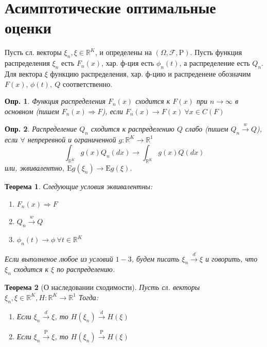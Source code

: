 \documentclass[12pt]{article}
\newtheorem{definition}{Опр.}
\theoremstyle{basic_theorem}
\newtheorem{theorem}{Теорема}
\theoremstyle{name_theorem}
\def\R{ \mathbb{R} }
\def\E{ \mathrm{E} }
\def\P{ \mathrm{P} }
\begin{document}
\tableofcontents

\newpage

\section{Асимптотические оптимальные оценки}
    Пусть сл. векторы \(\xi_n, \xi \in \R^K\), и определены на \((\Omega, \mathcal{F}, \P)\).
Пусть функция распределения \(\xi_n\) есть \(F_n(x)\), хар. ф-ция есть \(\phi_n(t)\), а распределение
есть \(Q_n\). Для вектора \(\xi\) функцию распределения, хар. ф-цию и распреденеие обозначим \(F(x)\),
\(\phi(t),\ Q\) соответственно.

\begin{definition}
    Функция распределения \(F_n(x)\) сходится к \(F(x)\) при \(n \rightarrow \infty\) в основном
    (пишем \(F_n(x) \Rightarrow F\)), если \(F_n(x) \rightarrow F(x) \ \forall x \in C(F)\)
\end{definition}

\begin{definition}
    Распределение \(Q_n\) сходится к распределению \(Q\) слабо (пишем \(Q_n \xrightarrow{w} Q\)),
    если \(\forall\) непреревной и ограниченной \(g: \R^K \rightarrow \R^1\)
    \[ \int_{\R^K} g(x)Q_n(dx) \rightarrow \int_{\R^K} g(x)Q(dx)\]
    или, эквивалентно, \(\E g(\xi_n) \rightarrow \E g(\xi)\).
\end{definition}

\begin{theorem}
    Следующие условия эквивалентны:
    \begin{enumerate}
        \item \(F_n(x) \Rightarrow F\)
        \item \(Q_n \xrightarrow{w} Q\)
        \item \(\phi_n(t) \rightarrow \phi \ \forall t \in \R^K\)
    \end{enumerate}
    Если выполненое любое из условий \(1 - 3\), будем писать
    \(\xi_n \xrightarrow{d} \xi\) и говорить, что \(\xi_n\) сходится к \(\xi\) по распределению.
\end{theorem}

\begin{theorem}[О наследовании сходимости]
\label{th::inherit_conv}
    Пусть сл. векторы \(\xi_n, \xi \in \R^K, H: \R^K \rightarrow \R^1\)
    Тогда:
    \begin{enumerate}
        \item Если \(\xi_n \xrightarrow{d} \xi\), то \(H(\xi_n) \xrightarrow{d} H(\xi)\)
        \item Если \(\xi_n \xrightarrow{\P} \xi\), то \(H(\xi_n) \xrightarrow{\P} H(\xi)\)
    \end{enumerate}
\end{theorem}
\end{document}
